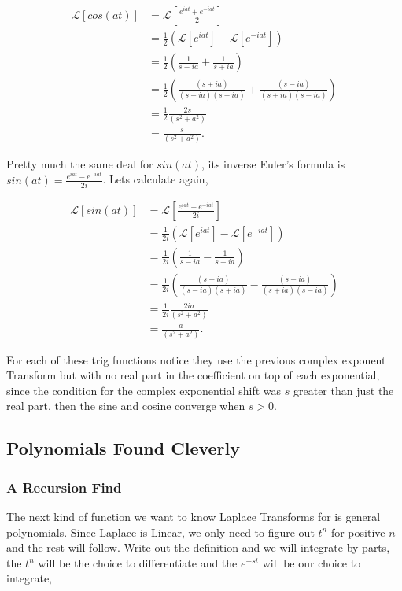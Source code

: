 \documentclass[12pt]{article}
\newcommand{\lp}{\mathscr{L}}
\begin{document}
\begin{align*}
    \lp[cos(at)]&=\lp\left[\frac{e^{iat}+e^{-iat}}{2}\right] \\
    &=\frac{1}{2}\left(\lp[e^{iat}]+\lp[e^{-iat}]\right) \\
    &=\frac{1}{2}\left(\frac{1}{s-ia}+\frac{1}{s+ia} \right) \\
    &=\frac{1}{2}\left(\frac{(s+ia)}{(s-ia)(s+ia)}+\frac{(s-ia)}{(s+ia)(s-ia)} \right) \\
    &=\frac{1}{2}\frac{2s}{(s^2+a^2)} \\
    &=\frac{s}{(s^2+a^2)}.
\end{align*}

Pretty much the same deal for $sin(at)$, its inverse Euler's formula is $sin(at)=\frac{e^{iat}-e^{-iat}}{2i}$. Lets calculate again,

\begin{align*}
    \lp[sin(at)]&=\lp\left[\frac{e^{iat}-e^{-iat}}{2i}\right] \\
    &=\frac{1}{2i}\left(\lp[e^{iat}]-\lp[e^{-iat}]\right) \\
    &=\frac{1}{2i}\left(\frac{1}{s-ia}-\frac{1}{s+ia} \right) \\
    &=\frac{1}{2i}\left(\frac{(s+ia)}{(s-ia)(s+ia)}-\frac{(s-ia)}{(s+ia)(s-ia)} \right) \\
    &=\frac{1}{2i}\frac{2ia}{(s^2+a^2)} \\
    &=\frac{a}{(s^2+a^2)}.
\end{align*}

For each of these trig functions notice they use the previous complex exponent Transform but with no real part in the coefficient on top of each exponential, since the condition for the complex exponential shift was $s$ greater than just the real part, then the sine and cosine converge when $s>0$.

\subsection{Polynomials Found Cleverly}

\subsubsection{A Recursion Find}

The next kind of function we want to know Laplace Transforms for is general polynomials. Since Laplace is Linear, we only need to figure out $t^n$ for positive $n$ and the rest will follow. Write out the definition and we will integrate by parts, the $t^n$ will be the choice to differentiate and the $e^{-st}$ will be our choice to integrate,
\end{document}
